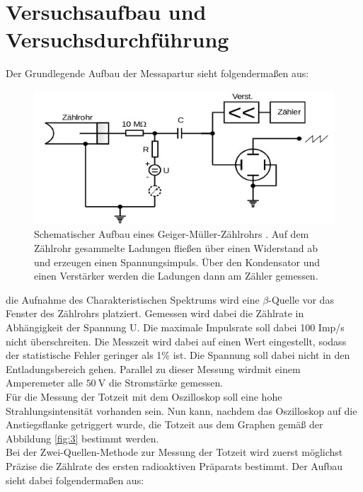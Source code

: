 \section{Versuchsaufbau und Versuchsdurchführung}\justifying
Der Grundlegende Aufbau der Messapartur sieht folgendermaßen aus:
\begin{figure}[H]
    \centering
    \includegraphics[width=\linewidth]{images/aufbau.jpg}
    \caption{Schematischer Aufbau eines Geiger-Müller-Zählrohrs \cite{V703}.
    Auf dem Zählrohr gesammelte Ladungen fließen über einen Widerstand ab und  
    erzeugen einen Spannungsimpuls. Über den Kondensator und einen Verstärker 
    werden die Ladungen dann am Zähler gemessen.
    }
    \label{fig:5}
\end{figure}
\justifying die Aufnahme des Charakteristischen Spektrums wird eine $\beta$-Quelle vor das
Fenster des Zählrohrs platziert. Gemessen wird dabei die Zählrate in Abhängigkeit
der Spannung U. Die maximale Impulsrate soll dabei 100 Imp/s nicht überschreiten.
Die Messzeit wird dabei auf einen Wert eingestellt, sodass der statistische Fehler 
geringer als 1\% ist. Die Spannung soll dabei nicht in den Entladungsbereich gehen.
Parallel zu dieser Messung wirdmit einem Amperemeter alle $\SI{50}{\volt} $ die Stromstärke
gemessen.\\
Für die Messung der Totzeit mit dem Oszilloskop soll eine hohe Strahlungsintensität vorhanden sein.
Nun kann, nachdem das Oszilloskop auf die Anstiegsflanke getriggert wurde, die Totzeit
aus dem Graphen gemäß der Abbildung \ref{fig:3} bestimmt werden.\\
Bei der Zwei-Quellen-Methode zur Messung der Totzeit wird zuerst möglichst Präzise die Zählrate des
ersten radioaktiven Präparats bestimmt. Der Aufbau sieht dabei folgendermaßen aus:
